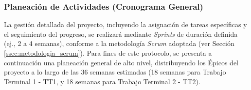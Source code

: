 \documentclass[12pt]{article}
\begin{document}
\subsubsection{Planeación de Actividades (Cronograma General)}
\label{ssec:planeacion_actividades_listas}

La gestión detallada del proyecto, incluyendo la asignación de tareas específicas y el seguimiento del progreso, se realizará mediante \textit{Sprints} de duración definida (ej., 2 a 4 semanas), conforme a la metodología \textit{Scrum} adoptada (ver Sección \ref{ssec:metodologia_scrum}). Para fines de este protocolo, se presenta a continuación una planeación general de alto nivel, distribuyendo los Épicos del proyecto a lo largo de las 36 semanas estimadas (18 semanas para Trabajo Terminal 1 - TT1, y 18 semanas para Trabajo Terminal 2 - TT2).
\end{document}
